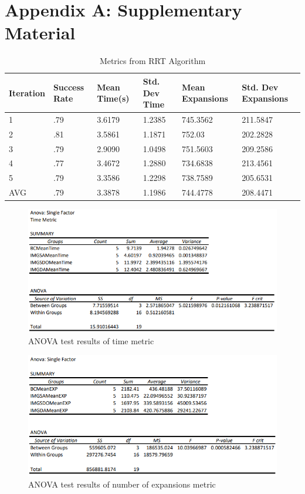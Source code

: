 \documentclass{article}
\begin{document}



\vspace{1cm}
\section{Appendix A: Supplementary Material}

\begin{table}[h]
  \caption{Metrics from RRT Algorithm}
  \label{RRT Metrics}
  \centering
  \begin{tabular}{llllll}
    \cmidrule(r){1-6}
   Iteration & Success Rate & Mean Time(s) & Std. Dev Time & Mean Expansions & Std. Dev Expansions\\
    \midrule
    1 & .79 & 3.6179 & 1.2385 & 745.3562 & 211.5847 \\
    2 & .81 & 3.5861 & 1.1871 & 752.03 & 202.2828 \\
    3 & .79 & 2.9090 & 1.0498 & 751.5603 & 209.2586 \\
    4 & .77 & 3.4672 & 1.2880 & 734.6838 & 213.4561 \\
    5 & .79 & 3.3586 & 1.2298 & 738.7589 & 205.6531 \\
 \midrule
  AVG & .79 & 3.3878 & 1.1986 & 744.4778 & 208.4471 \\
    \bottomrule
  \end{tabular}
\end{table}

\begin{figure}[h]
	\centerline{\includegraphics[scale=0.6]{TTG ANOVA.png}}
        \caption{ANOVA test results of time metric}
\end{figure}

\begin{figure}[h]
	\centerline{\includegraphics[scale=0.6]{ANOVAEXP.png}}
        \caption{ANOVA test results of number of expansions metric}
\end{figure}
\end{document}
